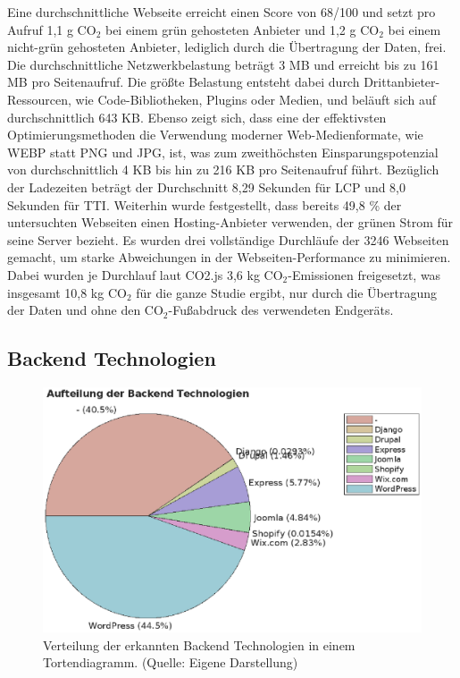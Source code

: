 \documentclass[Bachelor,BIF,german,IEEE]{BASE/twbook}
\begin{document}
\noindent Eine durchschnittliche Webseite erreicht einen Score von 68/100 und setzt pro Aufruf 1,1 g CO$_2$ bei einem grün gehosteten Anbieter und 1,2 g CO$_2$ bei einem nicht-grün gehosteten Anbieter, lediglich durch die Übertragung der Daten, frei. Die durchschnittliche Netzwerkbelastung beträgt 3 MB und erreicht bis zu 161 MB pro Seitenaufruf. Die größte Belastung entsteht dabei durch Drittanbieter-Ressourcen, wie Code-Bibliotheken, Plugins oder Medien, und beläuft sich auf durchschnittlich 643 KB. Ebenso zeigt sich, dass eine der effektivsten Optimierungsmethoden die Verwendung moderner Web-Medienformate, wie WEBP statt PNG und JPG, ist, was zum zweithöchsten Einsparungspotenzial von durchschnittlich 4 KB bis hin zu 216 KB pro Seitenaufruf führt. Bezüglich der Ladezeiten beträgt der Durchschnitt 8,29 Sekunden für \ac{LCP} und 8,0 Sekunden für \ac{TTI}. Weiterhin wurde festgestellt, dass bereits 49,8 \% der untersuchten Webseiten einen Hosting-Anbieter verwenden, der grünen Strom für seine Server bezieht. Es wurden drei vollständige Durchläufe der 3246 Webseiten gemacht, um starke Abweichungen in der Webseiten-Performance zu minimieren. Dabei wurden je Durchlauf laut CO2.js 3,6 kg CO$_2$-Emissionen freigesetzt, was insgesamt 10,8 kg CO$_2$ für die ganze Studie ergibt, nur durch die Übertragung der Daten und ohne den CO$_2$-Fußabdruck des verwendeten Endgeräts.

\subsection{Backend Technologien}
\begin{figure}[htbp]
\centering
\includegraphics[width=1.0\linewidth]{matlab/pieBackendTechnologies.eps}
\caption{Verteilung der erkannten Backend Technologien in einem Tortendiagramm. (Quelle: Eigene Darstellung)}
\label{Abb1}
\end{figure}
\end{document}
